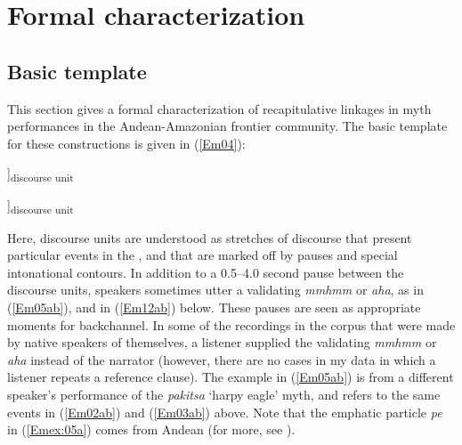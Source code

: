 \documentclass[output=paper]{LSP/langsci}
\begin{document}
\section{Formal characterization}
\label{Emformal}
\subsection{Basic template}
\label{Embasic}
This section gives a formal characterization of recapitulative linkages in  myth performances in the Andean-Amazonian frontier community. The basic template for these constructions is given in (\ref{Em04}): 
 

\begin{exe}
\ex \label{Em04}
\glt [...[\underline{Reference clause}]]\textsubscript{discourse unit}


\glt[[\textbf{Bridging clause}] [Discourse-new information]]\textsubscript{discourse unit}\\
\end{exe}


Here, discourse units are understood as stretches of discourse that present particular events in the , and that are marked off by pauses and special intonational contours. In addition to a 0.5--4.0 second pause between the discourse units, speakers sometimes utter a validating \textit{mmhmm} or \textit{aha}, as in (\ref{Em05ab}), and in (\ref{Em12ab}) below. These pauses are seen as appropriate moments for backchannel. In some of the recordings in the corpus that were made by native speakers of  themselves, a listener supplied the validating \textit{mmhmm} or \textit{aha} instead of the narrator (however, there are no cases in my data in which a listener repeats a reference clause). The example in (\ref{Em05ab}) is from a different speaker’s performance of the \textit{pakitsa} `harpy eagle' myth, and refers to the same events in (\ref{Em02ab}) and (\ref{Em03ab}) above. Note that the emphatic particle \textit{pe} in (\ref{Emex:05a}) comes from Andean  (for more, see ).
\end{document}
